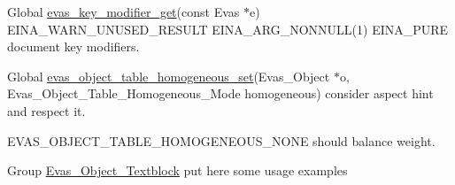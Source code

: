 \label{todo__todo000007}
\hypertarget{todo__todo000007}{}
 
\begin{DoxyDescription}
\item[Global \hyperlink{Evas_8h_a5c233a1e9eea970c1db0de87ff343e77}{evas\_\-key\_\-modifier\_\-get}(const Evas $\ast$e) EINA\_\-WARN\_\-UNUSED\_\-RESULT EINA\_\-ARG\_\-NONNULL(1) EINA\_\-PURE ]document key modifiers.
\end{DoxyDescription}

\label{todo__todo000002}
\hypertarget{todo__todo000002}{}
 
\begin{DoxyDescription}
\item[Global \hyperlink{group__Evas__Object__Table_ga85462a0cbafd4ee4ceface6f3f69b413}{evas\_\-object\_\-table\_\-homogeneous\_\-set}(Evas\_\-Object $\ast$o, Evas\_\-Object\_\-Table\_\-Homogeneous\_\-Mode homogeneous) ]consider aspect hint and respect it.

{\ttfamily EVAS\_\-OBJECT\_\-TABLE\_\-HOMOGENEOUS\_\-NONE} should balance weight.
\end{DoxyDescription}

\label{todo__todo000006}
\hypertarget{todo__todo000006}{}
 
\begin{DoxyDescription}
\item[Group \hyperlink{group__Evas__Object__Textblock}{Evas\_\-Object\_\-Textblock} ]put here some usage examples
\end{DoxyDescription}